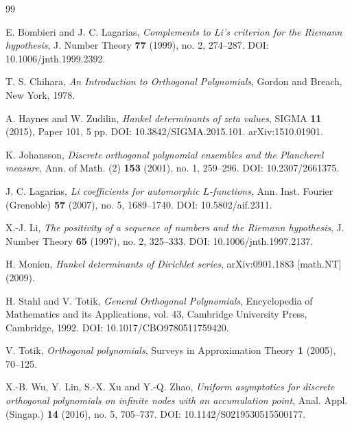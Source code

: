 \documentclass[11pt]{amsart}
\numberwithin{equation}{section}
\theoremstyle{plain}
\theoremstyle{definition}
\theoremstyle{remark}
\begin{document}
\begin{thebibliography}{99}

E. Bombieri and J. C. Lagarias,
\emph{Complements to Li's criterion for the Riemann hypothesis},
J. Number Theory \textbf{77} (1999), no. 2, 274--287.
DOI: 10.1006/jnth.1999.2392.

T. S. Chihara,
\emph{An Introduction to Orthogonal Polynomials},
Gordon and Breach, New York, 1978.

A. Haynes and W. Zudilin,
\emph{Hankel determinants of zeta values},
SIGMA \textbf{11} (2015), Paper 101, 5 pp.
DOI: 10.3842/SIGMA.2015.101. arXiv:1510.01901.

K. Johansson,
\emph{Discrete orthogonal polynomial ensembles and the Plancherel measure},
Ann. of Math. (2) \textbf{153} (2001), no. 1, 259--296.
DOI: 10.2307/2661375.

J. C. Lagarias,
\emph{Li coefficients for automorphic $L$-functions},
Ann. Inst. Fourier (Grenoble) \textbf{57} (2007), no. 5, 1689--1740.
DOI: 10.5802/aif.2311.

X.-J. Li,
\emph{The positivity of a sequence of numbers and the Riemann hypothesis},
J. Number Theory \textbf{65} (1997), no. 2, 325--333.
DOI: 10.1006/jnth.1997.2137.

H. Monien,
\emph{Hankel determinants of Dirichlet series},
arXiv:0901.1883 [math.NT] (2009).

H. Stahl and V. Totik,
\emph{General Orthogonal Polynomials},
Encyclopedia of Mathematics and its Applications, vol. 43,
Cambridge University Press, Cambridge, 1992.
DOI: 10.1017/CBO9780511759420.

V. Totik,
\emph{Orthogonal polynomials},
Surveys in Approximation Theory \textbf{1} (2005), 70--125.

X.-B. Wu, Y. Lin, S.-X. Xu and Y.-Q. Zhao,
\emph{Uniform asymptotics for discrete orthogonal polynomials on infinite nodes with an
accumulation point},
Anal. Appl. (Singap.) \textbf{14} (2016), no. 5, 705--737.
DOI: 10.1142/S0219530515500177.

\end{thebibliography}
\end{document}

